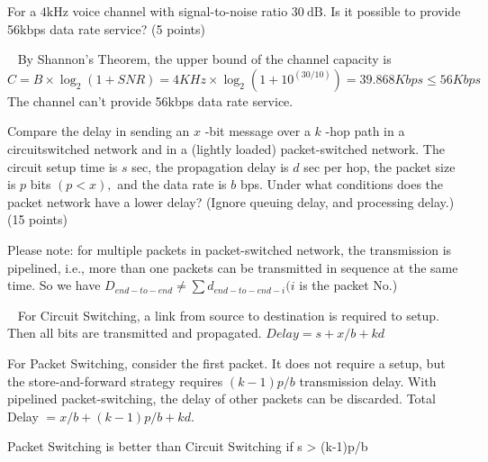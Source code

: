 \begin{exercise}[]{For a $4 \mathrm{kHz}$ voice channel with signal-to-noise ratio $30 \mathrm{~dB} .$ Is it possible to provide 56kbps data rate service? (5 points)}
  \begin{solution}
  \par{~} By Shannon's Theorem, the upper bound of the channel capacity is
  \begin{equation}
     C = B \times \log_2 (1 + SNR) = 4 KHz \times \log_2 (1 + 10^{(30/10)}) = 39.868 Kbps \le 56 Kbps
  \end{equation}
  The channel can't provide 56kbps data rate service.
  \end{solution}
  \label{ex5}
\end{exercise}


\begin{exercise}[]{Compare the delay in sending an $x$ -bit message over a $k$ -hop path in a circuitswitched network and in a (lightly loaded) packet-switched network. The circuit setup time is $s$ sec, the propagation delay is $d$ sec per hop, the packet size is $p$ bits $(p<x),$ and the data rate is $b$ bps. Under what conditions does the packet network have a lower delay? (Ignore queuing delay, and processing delay.) (15 points)
    
    Please note: for multiple packets in packet-switched network, the transmission is pipelined,
    i.e., more than one packets can be transmitted in sequence at the same time. So we have $D_{e n d-t o-e n d} \neq \sum d_{e n d-t o-e n d-i}(i$ is the packet No.)}
  \begin{solution}
  \par{~}
  For Circuit Switching, a link from source to destination is required to setup. Then all bits are transmitted and propagated. $Delay = s + x/b + kd$

  For Packet Switching, consider the first packet. It does not require a setup, but the store-and-forward strategy requires $(k - 1)p/b$ transmission delay. With pipelined packet-switching, the delay of other packets can be discarded. Total Delay $= x/b + (k - 1)p/b + kd$.

  Packet Switching is better than Circuit Switching if s > (k-1)p/b
  \end{solution}
  \label{ex6}
\end{exercise}